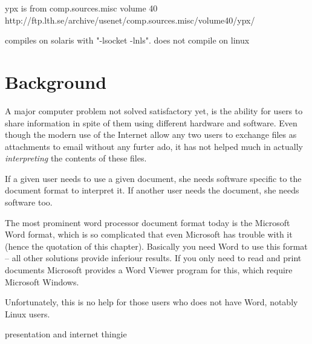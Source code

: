 















ypx is from comp.sources.misc volume 40
http://ftp.lth.se/archive/usenet/comp.sources.misc/volume40/ypx/

compiles on solaris with "-lsocket -lnls".  does not compile on linux



\section{Background}

A major computer problem not solved satisfactory yet, is the ability
for users to share information in spite of them using different
hardware and software.   Even though the modern use of the Internet
allow any two users to exchange files as attachments to
email
without any furter ado, it has not helped much in actually \textit{interpreting} the
contents of these files.

If a given user needs to use a given document, she needs software
specific to the document format to interpret it.  If another user
needs the document, she needs software too.

The most prominent word processor document format today is the
Microsoft Word format, which is so complicated that even Microsoft has
trouble with it (hence the quotation of this chapter).  Basically you
need Word to use this format -- all other solutions provide inferiour
results.  If you only need to read and print documents Microsoft
provides a Word Viewer program for this, which require Microsoft
Windows.

Unfortunately, this is no help for those users who does not have Word,
notably Linux users.

\textsf{presentation and internet thingie}




